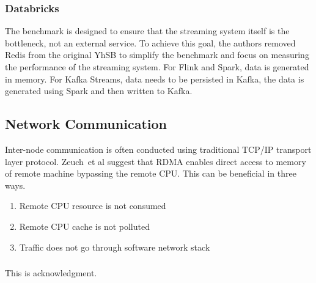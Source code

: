 \documentclass[runningheads]{llncs}
\begin{document}
\subsubsection{Databricks}
%
The benchmark is designed to ensure that the streaming system itself is the bottleneck, not an external service. 
To achieve this goal, the authors removed Redis from the original \gls{YhSB} to simplify the benchmark 
and focus on measuring the performance of the streaming system. For Flink and Spark, data is generated in memory. 
For Kafka Streams, data needs to be persisted in Kafka, the data is generated using Spark and then written to Kafka.

\subsection{Network Communication}
Inter-node communication is often conducted using
traditional TCP/IP transport layer protocol. Zeuch~et al suggest that \ac{RDMA}
enables direct access to memory of remote machine bypassing the remote CPU.
This can be beneficial in three ways.
\begin{enumerate}
\item Remote CPU resource is not consumed
\item Remote CPU cache is not polluted
\item Traffic does not go through software network stack
\end{enumerate}




\begin{credits}
\subsubsection{\ackname}
This is acknowledgment.

\end{credits}
%
%
%

% 
%

\end{document}
